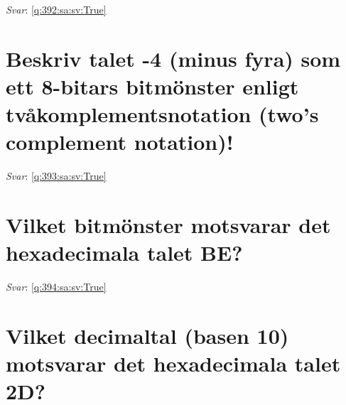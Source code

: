 \documentclass[a4paper,11pt,oneside]{book}
\begin{document}
\begin{sloppypar}
\label{q:392:sa:sv:False}

\vspace{2cm}

\noindent\makebox[\textwidth]{\hrulefill}

\vspace{1cm}

\textit{Svar}: \autoref{q:392:sa:sv:True}



\section{Beskriv talet -4 (minus fyra) som ett 8-bitars bitm\"onster enligt tv\r{a}komplementsnotation (two{\textquoteright}s complement notation)!}

\label{q:393:sa:sv:False}

\vspace{2cm}

\noindent\makebox[\textwidth]{\hrulefill}

\vspace{1cm}

\textit{Svar}: \autoref{q:393:sa:sv:True}



\section{Vilket bitm\"onster motsvarar det hexadecimala talet BE?}

\label{q:394:sa:sv:False}

\vspace{2cm}

\noindent\makebox[\textwidth]{\hrulefill}

\vspace{1cm}

\textit{Svar}: \autoref{q:394:sa:sv:True}



\section{Vilket decimaltal (basen 10) motsvarar det hexadecimala talet 2D?}

\label{q:395:sa:sv:False}

\vspace{2cm}

\noindent\makebox[\textwidth]{\hrulefill}

\vspace{1cm}


\end{sloppypar}
\end{document}
